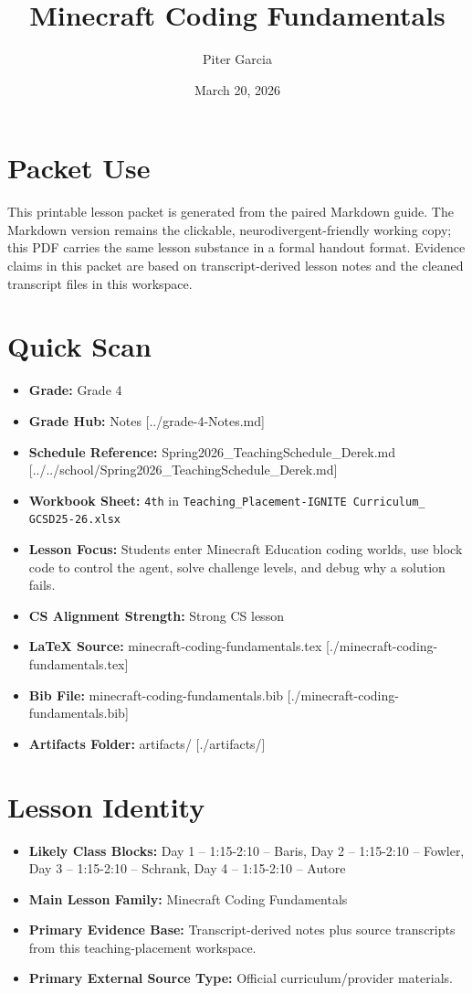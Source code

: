 \documentclass[11pt]{article}
\title{Minecraft Coding Fundamentals}
\author{Piter Garcia}
\date{March 20, 2026}
\begin{document}
\maketitle
\section*{Packet Use}
This printable lesson packet is generated from the paired Markdown guide. The Markdown version remains the clickable, neurodivergent-friendly working copy; this PDF carries the same lesson substance in a formal handout format. Evidence claims in this packet are based on transcript-derived lesson notes and the cleaned transcript files in this workspace.

\section*{Quick Scan}
\begin{itemize}[leftmargin=*]
\item \textbf{Grade:} Grade 4
\item \textbf{Grade Hub:} Notes [../grade-4-Notes.md]
\item \textbf{Schedule Reference:} Spring2026\_TeachingSchedule\_Derek.md [../../school/Spring2026\_TeachingSchedule\_Derek.md]
\item \textbf{Workbook Sheet:} \texttt{4th} in \texttt{Teaching\_Placement-IGNITE Curriculum\_ GCSD25-26.xlsx}
\item \textbf{Lesson Focus:} Students enter Minecraft Education coding worlds, use block code to control the agent, solve challenge levels, and debug why a solution fails.
\item \textbf{CS Alignment Strength:} Strong CS lesson
\item \textbf{LaTeX Source:} minecraft-coding-fundamentals.tex [./minecraft-coding-fundamentals.tex]
\item \textbf{Bib File:} minecraft-coding-fundamentals.bib [./minecraft-coding-fundamentals.bib]
\item \textbf{Artifacts Folder:} artifacts/ [./artifacts/]
\end{itemize}

\section*{Lesson Identity}
\begin{itemize}[leftmargin=*]
\item \textbf{Likely Class Blocks:} Day 1 -- 1:15-2:10 -- Baris, Day 2 -- 1:15-2:10 -- Fowler, Day 3 -- 1:15-2:10 -- Schrank, Day 4 -- 1:15-2:10 -- Autore
\item \textbf{Main Lesson Family:} Minecraft Coding Fundamentals
\item \textbf{Primary Evidence Base:} Transcript-derived notes plus source transcripts from this teaching-placement workspace.
\item \textbf{Primary External Source Type:} Official curriculum/provider materials.
\end{itemize}
\end{document}
